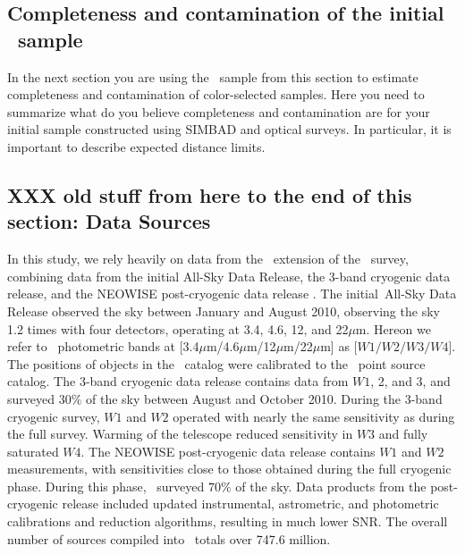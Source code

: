 {\color{red}{How was it merged, which further cuts and why...}}


\subsection{Completeness and contamination of the initial \agb\ sample}

In the next section you are using the \agb\ sample from this section to 
estimate completeness and contamination of color-selected samples. Here
you need to summarize what do you believe completeness and contamination
are for your initial sample constructed using SIMBAD and optical surveys.
In particular, it is important to describe expected distance limits. 








\subsection{XXX old stuff from here to the end of this section: Data Sources}
\label{sec:sources}
In this study, we rely heavily on data from the \allwise\, extension of the \wise\, survey, combining data from the initial All-Sky Data Release, the 3-band cryogenic data release, and the NEOWISE post-cryogenic data release \citep{2013wise.rept....1C}. The initial \wise\,All-Sky Data Release observed the sky between January and August 2010, observing the sky 1.2 times with four detectors, operating at 3.4, 4.6, 12, and 22$\mu$m. Hereon we refer to \allwise\, photometric bands at [3.4$\mu$m/4.6$\mu$m/12$\mu$m/22$\mu$m] as [$W1/W2/W3/W4$]. The positions of objects in the \wise\, catalog were calibrated to the \twomass\, point source catalog. The 3-band cryogenic data release contains data from $W1$, 2, and 3, and surveyed $30\%$ of the sky between August and October 2010. During the 3-band cryogenic survey, $W1$ and $W2$ operated with nearly the same sensitivity as during the full survey. Warming of the telescope reduced sensitivity in $W3$ and fully saturated $W4$. The NEOWISE post-cryogenic data release contains $W1$ and $W2$ measurements, with sensitivities close to those obtained during the full cryogenic phase. During this phase, \wise\, surveyed $70\%$ of the sky. Data products from the post-cryogenic release included updated instrumental, astrometric, and photometric calibrations and reduction algorithms, resulting in much lower SNR. The overall number of sources compiled into \allwise\, totals over 747.6 million.

